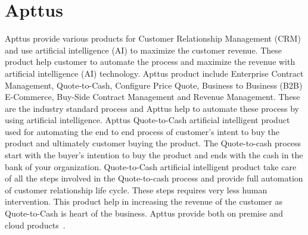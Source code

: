 \section{Apttus}

Apttus provide various products for Customer Relationship Management
(CRM) and use artificial intelligence (AI) to maximize the customer
revenue. These product help customer to automate the process and
maximize the revenue with artificial intelligence (AI)
technology. Apttus product include Enterprise Contract Management,
Quote-to-Cash, Configure Price Quote, Business to Business (B2B)
E-Commerce, Buy-Side Contract Management and Revenue Management. These
are the industry standard process and Apttus help to automate these
process by using artificial intelligence. Apttus Quote-to-Cash
artificial intelligent product used for automating the end to end
process of customer's intent to buy the product and ultimately
customer buying the product. The Quote-to-cash process start with the
buyer's intention to buy the product and ends with the cash in the
bank of your organization. Quote-to-Cash artificial intelligent
product take care of all the steps involved in the Quote-to-cash
process and provide full automation of customer relationship life
cycle. These steps requires very less human intervention. This product
help in increasing the revenue of the customer as Quote-to-Cash is
heart of the business. Apttus provide both on premise and cloud
products~\cite{hid-sp18-511-apttus}.
 
